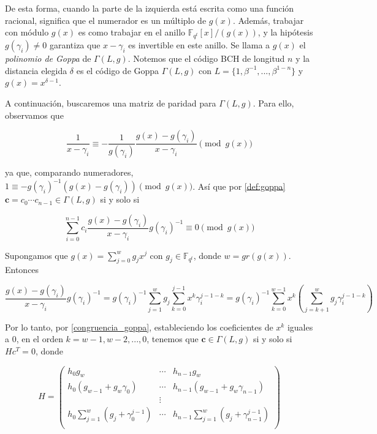 De esta forma, cuando la parte de la izquierda está escrita como una función racional, significa que el numerador es un múltiplo de $g(x)$. Además, trabajar con módulo $g(x)$ es como trabajar en el anillo $\mathbb{F}_{q^t}[x]/(g(x))$, y la hipótesis $g(\gamma_i) \neq 0$ garantiza que $x - \gamma_i$ es invertible en este anillo. Se llama a $g(x)$ el \emph{polinomio de Goppa} de $\Gamma(L,g)$. Notemos que el código BCH de longitud $n$ y la distancia elegida $\delta$ es el código de Goppa $\Gamma(L,g)$ con $L = \{ 1, \beta^{-1}, ..., \beta^{1-n} \}$ y $g(x) = x^{\delta - 1}$.

A continuación, buscaremos una matriz de paridad para $\Gamma(L,g)$. Para ello, observamos que

$$\frac{1}{x - \gamma_i} \equiv - \frac{1}{g(\gamma_i)} \frac{g(x) - g(\gamma_i)}{x - \gamma_i} \pmod{ g(x)}$$

ya que, comparando numeradores, $1 \equiv - g(\gamma_i)^{-1} \left( g(x) - g(\gamma_i) \right) \pmod{g(x)}$. Así que por \eqref{def:goppa} $\textbf{c} = c_0 \cdots c_{n-1} \in \Gamma(L,g)$ si y solo si

\begin{equation}
    \label{congruencia_goppa}
    \sum_{i=0}^{n-1} c_i \frac{g(x) - g(\gamma_i)}{x - \gamma_i} g(\gamma_i)^{-1} \equiv 0 \pmod{g(x)}
\end{equation}

Supongamos que $g(x) = \sum_{j=0}^w g_j x^j$ con $g_j \in \mathbb{F}_{q^t}$, donde $w = gr(g(x))$. Entonces

$$\frac{g(x) - g(\gamma_i)}{x - \gamma_i} g(\gamma_i)^{-1} = g(\gamma_i)^{-1} \sum_{j=1}^w g_j \sum_{k=0}^{j-1} x^k \gamma_i^{j-1-k} = g(\gamma_i)^{-1} \sum_{k=0}^{w-1} x^k \left( \sum_{j=k+1}^w g_j \gamma_i^{j-1-k} \right)$$

Por lo tanto, por \eqref{congruencia_goppa}, estableciendo los coeficientes de $x^k$ iguales a $0$, en el orden $k = w - 1, w - 2, ..., 0$, tenemos que $\textbf{c} \in \Gamma(L,g)$ si y solo si $Hc^T = 0$, donde 

\begin{equation}
    H = \left(
        \begin{array}{ccc} 
            h_0 g_w & \cdots & h_{n-1} g_w  \\
            h_0 (g_{w-1} + g_w \gamma_0) & \cdots & h_{n-1} (g_{w-1} + g_w \gamma_{n-1}) \\
            & \vdots & \\
            h_0 \sum_{j=1}^w \left( g_j + \gamma_0^{j-1} \right) & \cdots & h_{n-1} \sum_{j=1}^w \left( g_{j} + \gamma_{n-1}^{j-1} \right) \\
        \end{array}
        \right)
\end{equation}

